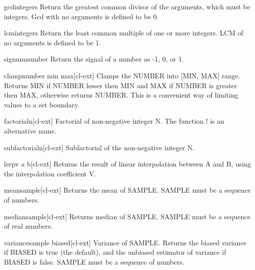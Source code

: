 \documentclass[10pt,english]{book}
\begin{document}
\begin{function}{gcd}{\rest integers}
  Return the greatest common divisor of the arguments, which must be
  integers. Gcd with no arguments is defined to be 0.
\end{function}

\begin{function}{lcm}{\rest integers}
  Return the least common multiple of one or more integers. LCM of no
  arguments is defined to be 1.
\end{function}

\begin{function}{signum}{number}
  Return the signal of a number as -1, 0, or 1.
\end{function}

\begin{function}{clamp}{number min max}[cl-ext]
  Clamps the NUMBER into [MIN, MAX] range. Returns MIN if NUMBER
  lesser then MIN and MAX if NUMBER is greater then MAX, otherwise
  returns NUMBER. This is a convenient way of limiting values to a set
  boundary.
\end{function}

\begin{function}{factorial}{n}[cl-ext]
  Factorial of non-negative integer N. The function ! is an
  alternative name.
\end{function}

\begin{function}{subfactorial}{n}[cl-ext]
  Subfactorial of the non-negative integer N.
\end{function}

\begin{function}{lerp}{v a b}[cl-ext]
  Returns the result of linear interpolation between A and B, using the
interpolation coefficient V.
\end{function}

\begin{function}{mean}{sample}[cl-ext]
  Returns the mean of SAMPLE. SAMPLE must be a sequence of numbers.
\end{function}

\begin{function}{median}{sample}[cl-ext]
  Returns median of SAMPLE. SAMPLE must be a sequence of real numbers.
\end{function}

\begin{function}{variance}{sample \key biased}[cl-ext]
  Variance of SAMPLE. Returns the biased variance if BIASED is true (the default),
and the unbiased estimator of variance if BIASED is false. SAMPLE must be a
sequence of numbers.
\end{function}
\end{document}
